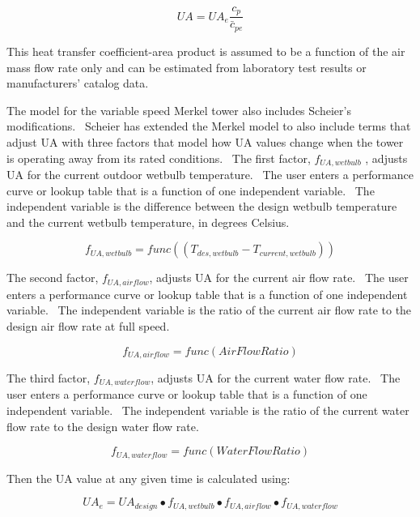 \begin{equation}
UA = UA_e\frac{{c_p}}{{\bar c_{pe}}}
\label{eq:UA514}
\end{equation}

This heat transfer coefficient-area product is assumed to be a function of the air mass flow rate only and can be estimated from laboratory test results or manufacturers' catalog data.

The model for the variable speed Merkel tower also includes Scheier's modifications.~ Scheier has extended the Merkel model to also include terms that adjust UA with three factors that model how UA values change when the tower is operating away from its rated conditions.~ The first factor, \({f_{UA,wetbulb}}\) , adjusts UA for the current outdoor wetbulb temperature.~ The user enters a performance curve or lookup table that is a function of one independent variable.~ The independent variable is the difference between the design wetbulb temperature and the current wetbulb temperature, in degrees Celsius.

\begin{equation}
{f_{UA,wetbulb}} = func\left( {\left( {{T_{des,wetbulb}} - {T_{current,wetbulb}}} \right)} \right)
\end{equation}

The second factor, \({f_{UA,airflow}}\), adjusts UA for the current air flow rate.~ The user enters a performance curve or lookup table that is a function of one independent variable.~ The independent variable is the ratio of the current air flow rate to the design air flow rate at full speed.

\begin{equation}
{f_{UA,airflow}} = func\left( {AirFlowRatio} \right)
\end{equation}

The third factor, \({f_{UA,waterflow}}\), adjusts UA for the current water flow rate.~ The user enters a performance curve or lookup table that is a function of one independent variable.~ The independent variable is the ratio of the current water flow rate to the design water flow rate.

\begin{equation}
{f_{UA,waterflow}} = func\left( {WaterFlowRatio} \right)
\end{equation}

Then the UA value at any given time is calculated using:

\begin{equation}
U{A_e} = U{A_{design}} \bullet {f_{UA,wetbulb}} \bullet {f_{UA,airflow}} \bullet {f_{UA,waterflow}}
\end{equation}

